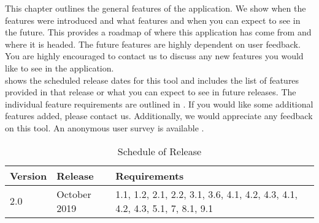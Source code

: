 This chapter outlines the general features of the \texttt{\getsoftwarename{}} application. We show when the features were introduced and what features and when you can expect to see in the future. This provides a roadmap of where this application has come from and where it is headed. The future features are highly dependent on user feedback. You are highly encouraged to contact us to discuss any new features you would like to see in the application.\\

 shows the scheduled release dates for this tool and includes the list of features provided in that release or what you can expect to see in future releases. The individual feature requirements are outlined in . If you would like some additional features added, please contact us.
Additionally, we would appreciate any feedback on this tool. An anonymous
user survey is available . \\

\begin{table}[hbt!]                    
  \centering
\begin{adjustbox}{max width=\textwidth}            
  \begin{tabular}{lll}                    
    \toprule          
      Version & 	Release	 & Requirements \\  \hline
      2.0	 & October 2019 & 1.1, 1.2, 2.1, 2.2, 3.1, 3.6, 4.1, 4.2, 4.3, 4.1, 4.2, 4.3, 5.1, 7, 8.1, 9.1\\  \hline
  \end{tabular}
\end{adjustbox}
  \caption{Schedule of Release}             
  \label{tab:schedule}                 
\end{table}


